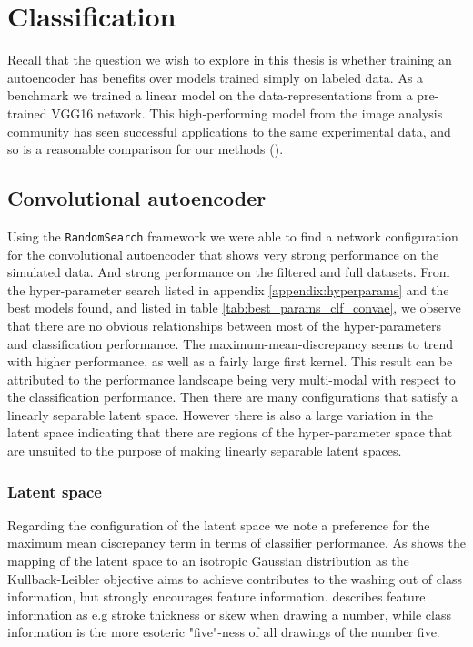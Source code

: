 \section{Classification}

Recall that the question we wish to explore in this thesis is whether training an autoencoder has benefits over models trained simply on labeled data. As a benchmark we trained a linear model on the data-representations from a pre-trained VGG16 network. This high-performing model from the image analysis community has seen successful applications to the same experimental data, and so is a reasonable comparison for our methods (\cite{Kuchera2019}). 

\subsection{Convolutional autoencoder}
Using the \lstinline{RandomSearch} framework we were able to find a network configuration for the convolutional autoencoder that shows very strong performance on the simulated data. And strong performance on the filtered and full datasets. From the hyper-parameter search listed in appendix \ref{appendix:hyperparams} and the best models found, and listed in table \ref{tab:best_params_clf_convae}, we observe that there are no obvious relationships between most of the hyper-parameters and classification performance. The maximum-mean-discrepancy seems to trend with higher performance, as well as a fairly large first kernel. This result can be attributed to the performance landscape being very multi-modal with respect to the classification performance. Then there are many configurations that satisfy a linearly separable latent space. However there is also a large variation in the latent space indicating that there are regions of the hyper-parameter space that are unsuited to the purpose of making linearly separable latent spaces.  

\subsubsection{Latent space}
Regarding the configuration of the latent space we note a preference for the maximum mean discrepancy term in terms of classifier performance. As \citet{Antoran2019} shows the mapping of the latent space to an isotropic Gaussian distribution as the Kullback-Leibler objective aims to achieve contributes to the washing out of class information, but strongly encourages feature information. \citet{Antoran2019} describes feature information as e.g stroke thickness or skew when drawing a number, while class information is the more esoteric "five"-ness of all drawings of the number five.

